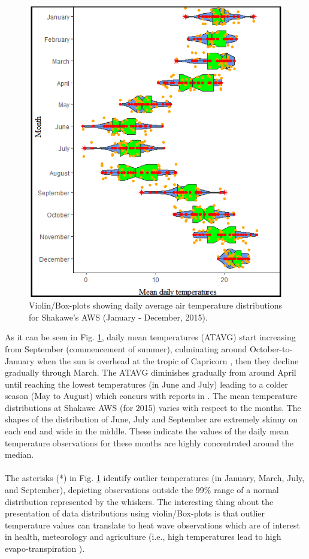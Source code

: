 \documentclass[a4paper, 10pt, conference]{ieeeconf}      %
\begin{document}
\begin{figure}[h]
	\centering
	\includegraphics[width=1\linewidth]{fig/BoxP}
	\caption{Violin/Box-plots showing  daily average air temperature distributions   for  Shakawe's AWS (January - December, 2015).
}
	\label{BoxP2020}
\end{figure}

\noindent
As it can be seen in Fig. \ref{BoxP2020}, daily mean temperatures (ATAVG) start increasing from September (commencement of summer), culminating around October-to-January when the sun is overhead at the tropic of Capricorn \cite{WeatherSilitshena}, then they decline gradually through March.  
The ATAVG diminishes gradually from around April until reaching the lowest temperatures (in June and July) leading to a colder season (May to August) which concurs with reports in \cite{moses2017heat,Nkemelang2018}. 
The mean temperature distributions at Shakawe AWS (for 2015) varies with respect to the months.
The shapes of the distribution of June, July and September are extremely skinny on each end and wide in the middle. These indicate the values of the daily mean temperature observations for these months are highly concentrated around the median.
\\
\\
The asterisks ({\color{red}*}) in Fig. \ref{BoxP2020} identify outlier temperatures (in January, March, July, and September), depicting observations outside the 99\% range of a normal distribution represented by the whiskers. The interesting thing about the presentation of data distributions using violin/Box-plots is that outlier temperature values can translate to heat wave observations which are of interest in health, meteorology and agriculture (i.e., high temperatures lead to high evapo-transpiration \cite{moses2018effects}).
\end{document}
